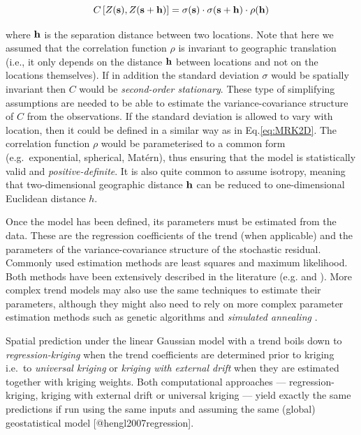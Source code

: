 \documentclass[11pt]{krantz}
\makeatletter
\newenvironment{kframe}{%
\medskip{}
\setlength{\fboxsep}{.8em}
 \def\at@end@of@kframe{}%
 \ifinner\ifhmode%
  \def\at@end@of@kframe{\end{minipage}}%
  \begin{minipage}{\columnwidth}%
 \fi\fi%
 \def\FrameCommand##1{\hskip\@totalleftmargin \hskip-\fboxsep
 \colorbox{shadecolor}{##1}\hskip-\fboxsep
     \hskip-\linewidth \hskip-\@totalleftmargin \hskip\columnwidth}%
 \MakeFramed {\advance\hsize-\width
   \@totalleftmargin\z@ \linewidth\hsize
   \@setminipage}}%
 {\par\unskip\endMakeFramed%
 \at@end@of@kframe}
\newenvironment{rmdblock}[1]
  {
  \begin{itemize}
  \renewcommand{\labelitemi}{
    \raisebox{-.7\height}[0pt][0pt]{
      {\setkeys{Gin}{width=3em,keepaspectratio}\texttt{[image: images/\#1]}}
    }
  }
  \setlength{\fboxsep}{1em}
  \begin{kframe}
  \item
  }
  {
  \end{kframe}
  \end{itemize}
  }
\newenvironment{rmdnote}
  {\begin{rmdblock}{note}}
  {\end{rmdblock}}
\theoremstyle{definition}
\theoremstyle{definition}
\theoremstyle{definition}
\theoremstyle{remark}
\makeatother
\begin{document}
\begin{equation}
C\left[Z({\bf{s}}),Z({\bf{s}}+\bf{h})\right] = \sigma (\bf{s}) \cdot \sigma(\bf{s}+\bf{h}) \cdot \rho (\bf{h})
\end{equation}

where \({\bf{h}}\) is the separation distance between two locations.
Note that here we assumed that the correlation function \(\rho\) is
invariant to geographic translation (i.e., it only depends on the
distance \(\bf{h}\) between locations and not on the locations
themselves). If in addition the standard deviation \(\sigma\) would be
spatially invariant then \(C\) would be \emph{second-order stationary}.
These type of simplifying assumptions are needed to be able to estimate
the variance-covariance structure of \(C\) from the observations. If the
standard deviation is allowed to vary with location, then it could be
defined in a similar way as in Eq.\eqref{eq:MRK2D}. The correlation
function \(\rho\) would be parameterised to a common form
(e.g.~exponential, spherical, Matérn), thus ensuring that the model is
statistically valid and \emph{positive-definite}. It is also quite
common to assume isotropy, meaning that two-dimensional geographic
distance \({\bf{h}}\) can be reduced to one-dimensional Euclidean
distance \(h\).

Once the model has been defined, its parameters must be estimated from
the data. These are the regression coefficients of the trend (when
applicable) and the parameters of the variance-covariance structure of
the stochastic residual. Commonly used estimation methods are least
squares and maximum likelihood. Both methods have been extensively
described in the literature (e.g. \citet{Webster2001Wiley} and
\citet{Diggle2007Springer}). More complex trend models may also use the
same techniques to estimate their parameters, although they might also
need to rely on more complex parameter estimation methods such as
genetic algorithms and \emph{simulated annealing}
\citep{lark2003fitting}.

\begin{rmdnote}
Spatial prediction under the linear Gaussian model with a trend boils
down to \emph{regression-kriging} when the trend coefficients are
determined prior to kriging i.e.~to \emph{universal kriging} or
\emph{kriging with external drift} when they are estimated together with
kriging weights. Both computational approaches --- regression-kriging,
kriging with external drift or universal kriging --- yield exactly the
same predictions if run using the same inputs and assuming the same
(global) geostatistical model {[}@hengl2007regression{]}.
\end{rmdnote}
\end{document}
